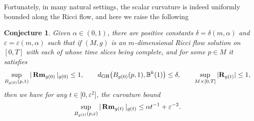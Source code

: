 \documentclass[pdftex]{sigma}
\numberwithin{equation}{section}
\newtheorem{Conjecture}[Theorem]{Conjecture}
\newcommand{\Rm}{\operatorname{\bf Rm}}
\newcommand{\Sc}{\mathbf{R}}
\begin{document}
Fortunately, in many natural settings, the scalar curvature is indeed uniformly
bounded along the Ricci flow, and here we raise the following
\begin{Conjecture}
Given $\alpha\in (0,1)$, there are positive constants
$\delta=\delta(m,\alpha)$ and $\varepsilon=\varepsilon(m,\alpha)$ such that
if $(M,g)$ is an $m$-dimensional Ricci flow solution on $[0,T]$ with each of whose
time slices being complete, and for some $p\in M$ it satisfies
\begin{align*}
\sup_{B_{g(0)}(p,1)} |\Rm_{g(0)} |_{g(0)} \le 1,\qquad
d_{\rm GH}\big(B_{g(0)}(p,1),\mathbb{B}^k(1)\big) \le
\delta,\qquad \sup_{M\times [0,T]} |\Sc_{g(t)} | \le 1,
\end{align*}
then we have for any $t\in \big[0,\varepsilon^2\big]$, the curvature bound
\begin{align*}
\sup_{B_{g(t)}(p,\varepsilon)} |\Rm_{g(t)} |_{g(t)} \le \alpha
t^{-1} + \varepsilon^{-2}.
\end{align*}
\end{Conjecture}
\end{document}
